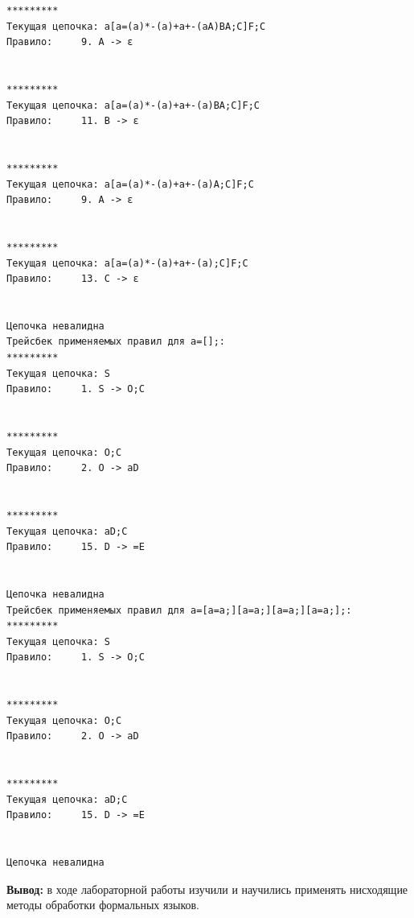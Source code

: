 \documentclass[a4paper,14pt]{extarticle}
\begin{document}
\begin{enumerate}[1.]
\begin{verbatim}
*********
Текущая цепочка: a[a=(a)*-(a)+a+-(aA)BA;C]F;C
Правило:     9. A -> ε


*********
Текущая цепочка: a[a=(a)*-(a)+a+-(a)BA;C]F;C
Правило:     11. B -> ε


*********
Текущая цепочка: a[a=(a)*-(a)+a+-(a)A;C]F;C
Правило:     9. A -> ε


*********
Текущая цепочка: a[a=(a)*-(a)+a+-(a);C]F;C
Правило:     13. C -> ε


Цепочка невалидна
Трейсбек применяемых правил для a=[];:
*********
Текущая цепочка: S
Правило:     1. S -> O;C


*********
Текущая цепочка: O;C
Правило:     2. O -> aD


*********
Текущая цепочка: aD;C
Правило:     15. D -> =E


Цепочка невалидна
Трейсбек применяемых правил для a=[a=a;][a=a;][a=a;][a=a;];:
*********
Текущая цепочка: S
Правило:     1. S -> O;C


*********
Текущая цепочка: O;C
Правило:     2. O -> aD


*********
Текущая цепочка: aD;C
Правило:     15. D -> =E


Цепочка невалидна
    \end{verbatim}
\end{enumerate}

\textbf{Вывод: } в ходе лабораторной работы изучили и научились применять нисходящие методы обработки формальных языков.
\end{document}
